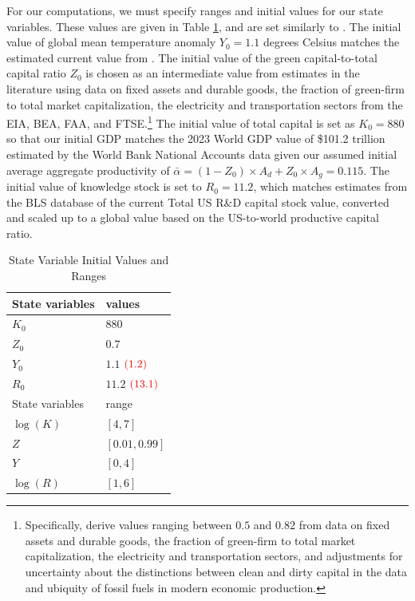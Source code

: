 \documentclass[12pt]{article}
\begin{document}
\begin{appendices}
For our computations, we must specify ranges and initial values for our state variables. These values are given in Table \ref{table:state_space}, and are set similarly to \cite{BarnettBrockHansenZhang:2023}. The initial value of global mean temperature anomaly $Y_0 = 1.1$ degrees Celsius matches the estimated current value from \cite{IPCC:2021}. The initial value of the green capital-to-total capital ratio $Z_0$ is chosen as an intermediate value from estimates in the literature using  data on fixed assets and durable goods, the fraction of green-firm to total market capitalization, the electricity and transportation sectors from the EIA, BEA, FAA, and FTSE.\footnote{Specifically, \cite{fried2021macro, dhar2022investor, carattini2023climate, berk2025impact} derive values ranging between $0.5$ and $0.82$ from data on fixed assets and durable goods, the fraction of green-firm to total market capitalization, the electricity and transportation sectors, and adjustments for uncertainty about the distinctions between clean and dirty capital in the data and ubiquity of fossil fuels in modern economic production.} The initial value of total capital is set as $K_0=880$ so that our initial GDP matches the 2023 World GDP value of \$101.2 trillion estimated by the World Bank National Accounts data given our assumed initial average aggregate productivity of $\bar{\alpha} = (1-Z_0)\times A_d + Z_0\times A_g = 0.115$. The initial value of knowledge stock is set to $R_{0}= 11.2$, which matches estimates from the BLS database of the current Total US R\&D capital stock value, converted and scaled up to a global value based on the US-to-world productive capital ratio. 



\begin{table}[H]
\caption{State Variable Initial Values and Ranges}\label{table:state_space}
	\centering
	\begin{tabular}{ll}
   \hline
		State variables & values \\
		\toprule
		$K_0$ & $880$ \\
        $Z_0$ & $0.7$ \\
        $Y_0$ & $1.1$ ${\color{red}(1.2)}$ \\
		$R_{0}$ &  $11.2$ ${\color{red}(13.1)}$\\
  \hline
		State variables & range\\  
    \hline
   $\log(K)$ & $ [4, 7]$ \\
	$Z$ & $[0.01, 0.99]$ \\
	$Y$ & $[0, 4]$ \\
	$\log(R) $ & $[1 , 6]$ \\
		\bottomrule
	\end{tabular}
\end{table}


\end{appendices}
\end{document}
